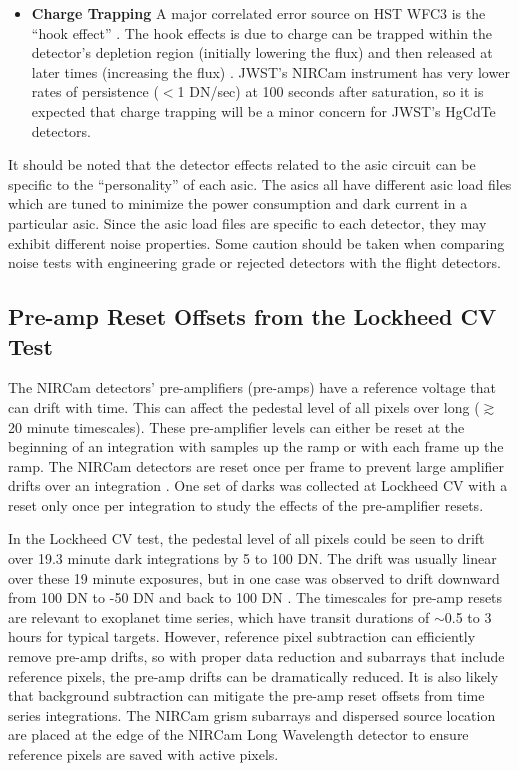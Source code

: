 \documentclass{aastex62}
\begin{document}
\begin{itemize}[noitemsep]
	\item \textbf{Charge Trapping} A major correlated error source on HST WFC3 is the ``hook effect'' \citep{berta2012flat_gj1214}.
	The hook effects is due to charge can be trapped within the detector's depletion region (initially lowering the flux) and then released at later times (increasing the flux) \citep{zhou2017chargeTrap}.
	JWST's NIRCam instrument has very lower rates of persistence ($<$1 DN/sec) at 100 seconds after saturation, so it is expected that charge trapping will be a minor concern for JWST's HgCdTe detectors.
\end{itemize}

It should be noted that the detector effects related to the asic circuit can be specific to the ``personality'' of each asic. The asics all have different asic load files which are tuned to minimize the power consumption and dark current in a particular asic. Since the asic load files are specific to each detector, they may exhibit different noise properties.
Some caution should be taken when comparing noise tests with engineering grade or rejected detectors with the flight detectors.

\subsection{Pre-amp Reset Offsets from the Lockheed CV Test}\label{sec:preAmp}

The NIRCam detectors' pre-amplifiers (pre-amps) have a reference voltage that can drift with time.
This can affect the pedestal level of all pixels over long ($\gtrsim$ 20 minute timescales).
These pre-amplifier levels can either be reset at the beginning of an integration with samples up the ramp or with each frame up the ramp.
The NIRCam detectors are reset once per frame to prevent large amplifier drifts over an integration \citep{robberto2014refPixPreAmp}.
One set of darks was collected at Lockheed CV with a reset only once per integration to study the effects of the pre-amplifier resets.

In the Lockheed CV test, the pedestal level of all pixels could be seen to drift over 19.3 minute dark integrations by 5 to 100 DN.
The drift was usually linear over these 19 minute exposures, but in one case was observed to drift downward from 100 DN to -50 DN and back to 100 DN \citep{robberto2014refPixPreAmp}.
The timescales for pre-amp resets are relevant to exoplanet time series, which have transit durations of $\sim$0.5 to 3 hours for typical targets.
However, reference pixel subtraction can efficiently remove pre-amp drifts, so with proper data reduction and subarrays that include reference pixels, the pre-amp drifts can be dramatically reduced.
It is also likely that background subtraction can mitigate the pre-amp reset offsets from time series integrations.
The NIRCam grism subarrays and dispersed source location are placed at the edge of the NIRCam Long Wavelength detector to ensure reference pixels are saved with active pixels.
\end{document}
